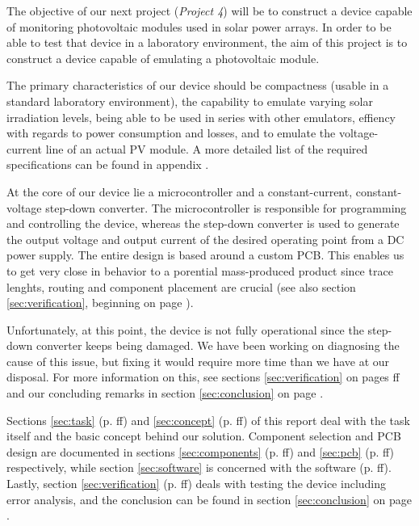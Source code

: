 
The objective  of our next project  (\emph{Project 4}) will be  to construct a
device  capable  of  monitoring  photovoltaic  modules  used  in  solar  power
arrays. In order to  be able to test that device  in a laboratory environment,
the  aim of  this project  is to  construct a  device capable  of emulating  a
photovoltaic module.

The primary characteristics  of our device should be compactness  (usable in a
standard  laboratory environment),  the  capability to  emulate varying  solar
irradiation levels,  being able  to be  used in  series with  other emulators,
effiency with  regards to  power consumption  and losses,  and to  emulate the
voltage-current  line  of  an  actual  PV  module. A  more  detailed  list  of
the  required specifications  can  be  found in  appendix  . %

At  the core  of  our device  lie a  microcontroller  and a  constant-current,
constant-voltage step-down converter.  The  microcontroller is responsible for
programming and  controlling the  device, whereas  the step-down  converter is
used  to  generate the  output  voltage  and  output  current of  the  desired
operating point  from a DC power  supply. The entire design is  based around a
custom  PCB. This enables  us to  get very  close in  behavior to  a porential
mass-produced  product since  trace lenghts,  routing and  component placement
are  crucial  (see  also  section \ref{sec:verification},  beginning  on  page
\pageref{sec:verification}).

Unfortunately,  at this  point,  the  device is  not  fully operational  since
the  step-down  converter  keeps  being   damaged. We  have  been  working  on
diagnosing  the  cause  of  this  issue, but  fixing  it  would  require  more
time  than   we  have   at  our  disposal. For   more  information   on  this,
see  sections  \ref{sec:verification}  on  pages  \pageref{sec:verification}ff
and   our  concluding   remarks  in   section  \ref{sec:conclusion}   on  page
\pageref{sec:conclusion}.

Sections  \ref{sec:task}   (p.  \pageref{sec:task}ff)   and  \ref{sec:concept}
(p.   \pageref{sec:concept}ff)   of   this   report   deal   with   the   task
itself  and  the  basic   concept  behind  our  solution. Component  selection
and   PCB  design   are  documented   in  sections   \ref{sec:components}  (p.
\pageref{sec:components}ff)   and   \ref{sec:pcb}   (p.   \pageref{sec:pcb}ff)
respectively, while section \ref{sec:software}  is concerned with the software
(p.  \pageref{sec:software}ff).   Lastly, section  \ref{sec:verification}  (p.
\pageref{sec:verification}ff) deals  with testing  the device  including error
analysis, and the  conclusion can be found in  section \ref{sec:conclusion} on
page \pageref{sec:conclusion}.
